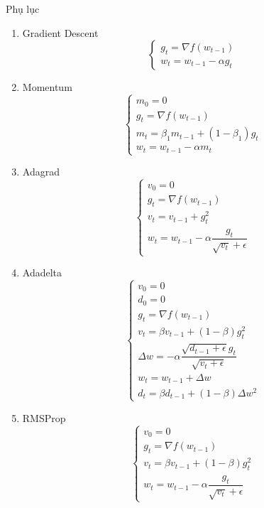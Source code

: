 \documentclass[10pt]{beamer}
\theoremstyle{remark}
\theoremstyle{definition}
\begin{document}
\begin{frame}[allowframebreaks]{Phụ lục}
	\begin{enumerate}
		\item  Gradient Descent
		\begin{equation*}
			\begin{cases}g_t = \nabla f(w_{t-1}) \\ w_t = w_{t-1} - \alpha g_t\end{cases}
		\end{equation*}
		\item Momentum
		\begin{equation*}
			\begin{cases}m_0 = 0 \\ g_t = \nabla f(w_{t-1}) 
				\\ m_t = \beta_1 m_{t-1} + (1-\beta_1)g_t\\ w_t = w_{t-1} - \alpha m_t\end{cases}
		\end{equation*}
		\item Adagrad
		\begin{equation*}
			\begin{cases}v_0 = 0\\ g_t = \nabla f(w_{t-1}) \\ v_t = v_{t-1} + g_t^2 \\ w_t = w_{t-1} - \alpha \dfrac{g_t}{\sqrt{v_t} + \epsilon} \end{cases}
		\end{equation*}
		\item Adadelta
		\begin{equation*}
			\begin{cases}v_0 = 0\\d_0 = 0 \\ g_t = \nabla f(w_{t-1}) \\ v_t = \beta v_{t-1} + (1-\beta)g_t^2 \\ \Delta w = - \alpha \dfrac{\sqrt{d_{t-1} + \epsilon}g_t}{\sqrt{v_t + \epsilon}} \\ w_t = w_{t-1} + \Delta w \\ d_t = \beta d_{t-1} + (1 - \beta) \Delta w^2 \end{cases}
		\end{equation*}
		\item RMSProp
		\begin{equation*}
			\begin{cases}v_0 = 0\\ g_t = \nabla f(w_{t-1}) \\ v_t = \beta v_{t-1} + (1-\beta)g_t^2 \\ w_t = w_{t-1} - \alpha \dfrac{g_t}{\sqrt{v_t} + \epsilon} \end{cases}

\end{equation*}
\end{enumerate}
\end{frame}
\end{document}
